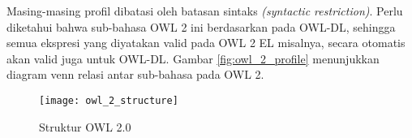 Masing-masing profil dibatasi oleh batasan sintaks \emph{(syntactic restriction)}. Perlu diketahui bahwa sub-bahasa OWL 2 ini berdasarkan pada OWL-DL, sehingga semua ekspresi yang diyatakan valid pada OWL 2 EL misalnya, secara otomatis akan valid juga untuk OWL-DL. Gambar \ref{fig:owl_2_profile} menunjukkan diagram venn relasi antar sub-bahasa pada OWL 2.

\begin{figure}[ht]
	\centering
	\texttt{[image: owl\_2\_structure]}
	\caption{Struktur OWL 2.0}
	\label{fig:owl_2_structure}
\end{figure}